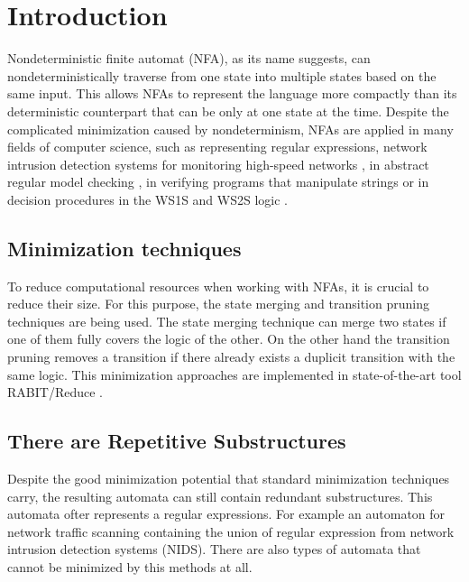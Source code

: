 \documentclass{ExcelAtFIT}
\affiliation{*%
  \href{mailto:xsedym02@stud.fit.vutbr.cz}{xsedym02@stud.fit.vutbr.cz},
  \textit{Faculty of Information Technology, Brno University of Technology}}
\begin{document}
\startdocument


\section{Introduction}
	Nondeterministic finite automat (NFA), as its name suggests, can nondeterministically traverse from one state into multiple states based on the same input. This allows NFAs to represent the language more compactly than its deterministic counterpart that can be only at one state at the time. Despite the complicated minimization caused by nondeterminism, NFAs are applied in many fields of computer science, such as representing regular expressions, network intrusion detection systems for monitoring high-speed networks \cite{FPGA_based_network_scaning, Approximated_reduction}, in abstract regular model checking \cite{ARMC}, in verifying programs that manipulate strings \cite{String_constraints_for_ver} or in decision procedures in the WS1S and WS2S logic \cite{On_equivalence_checking, Nested_antichains_for_WS1S}.

	\subsection*{Minimization techniques}
		To reduce computational resources when working with NFAs, it is crucial to reduce their size. For this purpose, the state merging \cite{Oldest_Merge,Simulation_based_minimization,On_nfa_reduction} and transition pruning \cite{Simulation_based_minimization, Lorenzo_prunning_saturation} techniques are being used. The state merging technique can merge two states if one of them fully covers the logic of the other. On the other hand the transition pruning removes a transition if there already exists a duplicit transition with the same logic. This minimization approaches are implemented in state-of-the-art tool RABIT/Reduce \cite{RABIT}.

	\subsection*{There are Repetitive Substructures}
		Despite the good minimization potential that standard minimization techniques carry, the resulting automata can still contain redundant substructures. This automata ofter represents a regular expressions. For example an automaton for network traffic scanning containing the union of regular expression from network intrusion detection systems (NIDS). There are also types of automata that cannot be minimized by this methods at all.
\end{document}
